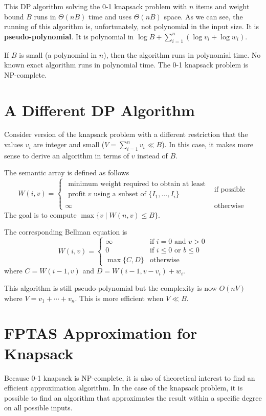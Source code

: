 This DP algorithm solving the 0-1 knapsack problem with $n$ items and weight bound $B$ runs in $\Theta(nB)$ time and uses $\Theta(nB)$ space. As we can see, the running of this algorithm is, unfortunately, not polynomial in the input size. It is \textbf{pseudo-polynomial}. It is polynomial in $\log B + \sum_{i=1}^n (\log v_i + \log w_i)$.

If $B$ is small (a polynomial in $n$), then the algorithm runs in polynomial time. No known exact algorithm runs in polynomial time. The 0-1 knapsack problem is NP-complete.

\section{A Different DP Algorithm}

Consider version of the knapsack problem with a different restriction that the values $v_i$ are integer and small ($V=\sum_{i=1}^n v_i \ll B$). In this case, it makes more sense to derive an algorithm in terms of $v$ instead of $B$.

The semantic array is defined as follows
$$
W(i,v) = \begin{cases}
    \substack{\text{minimum weight required to obtain at least} \\ \text{profit $v$ using a subset of $\{I_1,\ldots,I_i\}$}} & \text{if possible} \\
    \infty & \text{otherwise}
\end{cases}
$$
The goal is to compute $\max\{v \mid W(n,v) \leq B\}$.

The corresponding Bellman equation is
$$
W(i,v) = \begin{cases}
    \infty & \text{if $i=0$ and $v>0$} \\
    0 & \text{if $i\leq 0$ or $b\leq 0$} \\
    \max\{C,D\} & \text{otherwise}
\end{cases}
$$
where $C = W(i-1,v)$ and $D=W(i-1,v-v_i) + w_i$.

This algorithm is still pseudo-polynomial but the complexity is now $O(nV)$ where $V = v_1 + \cdots + v_n$. This is more efficient when $V \ll B$.

\section{FPTAS Approximation for Knapsack}

Because 0-1 knapsack is NP-complete, it is also of theoretical interest to find an efficient approximation algorithm. In the case of the knapsack problem, it is possible to find an algorithm that approximates the result within a specific degree on all possible inputs.


